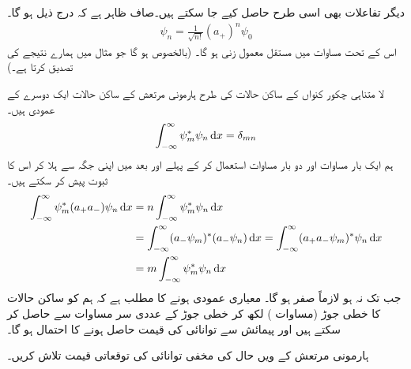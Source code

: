دیگر تفاعلات بھی اسی طرح حاصل کیے جا سکتے ہیں۔صاف ظاہر ہے کہ درج ذیل ہو گا۔ 
\begin{align}\label{مساوات_شروڈنگر_ہارمونی_ساکن_حالات}
\psi_n = \frac{1}{ \sqrt{n!} } ( a_+ )^n \psi_0
\end{align}
اس کے تحت مساوات  میں مستقل معمول  زنی  ہو گا۔   (بالخصوص  ہو گا جو مثال  میں ہمارے نتیجے کی تصدیق کرتا ہے۔)
 
لا متناہی  چکور  کنواں کے ساکن حالات کی طرح ہارمونی مرتعش کے ساکن حالات ایک دوسرے کے  عمودی ہیں۔ 
\begin{align}
\int_{ - \infty }^{ \infty } \psi_m^*\psi_n \dif x = \delta_{mn}
\end{align}
ہم ایک بار مساوات  اور دو بار مساوات  استعمال کر کے  پہلے    اور بعد میں  اپنی جگہ سے ہلا کر اس کا ثبوت پیش کر سکتے ہیں۔
\begin{align*}
\int_{ - \infty }^{ \infty } \psi_m^*(a_+ a_- )\psi_n \dif x &= n \int_{ - \infty }^{ \infty } \psi_m^* \psi_n \dif x
\\
&=\int_{ - \infty }^{ \infty } ( a_- \psi_m  )^*( a_- \psi_n ) \dif x = \int_{ - \infty }^{ \infty } ( a_+ a_- \psi_m)^* \psi_n \dif x\\
&= m \int_{ - \infty }^{ \infty } \psi_m^* \psi_n \dif x
\end{align*}
جب تک   نہ ہو   لازماً صفر ہو گا۔ معیاری عمودی ہونے کا مطلب  ہے کہ ہم 
 کو  ساکن حالات  کا خطی جوڑ (مساوات ) لکھ کر خطی جوڑ  کے عددی سر  مساوات  سے حاصل کر سکتے ہیں اور   پیمائش سے توانائی کی قیمت   حاصل ہونے کا  احتمال  ہو گا۔

ہارمونی مرتعش کے  ویں حال کی مخفی توانائی کی توقعاتی قیمت تلاش کریں۔

